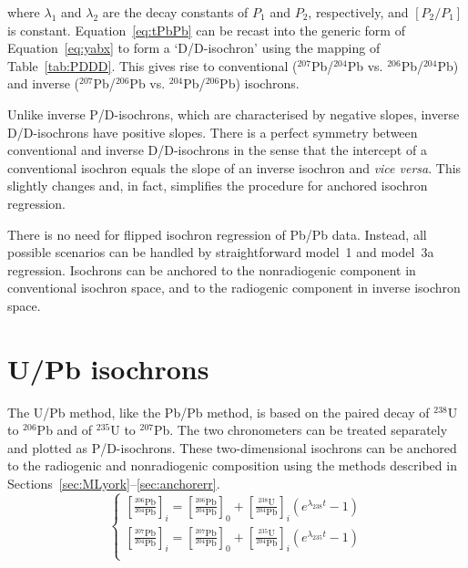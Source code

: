 \documentclass{article}
\begin{document}
\noindent where $\lambda_1$ and $\lambda_2$ are the decay constants of
$P_1$ and $P_2$, respectively, and $[P_2/P_1]$ is
constant. Equation~\ref{eq:tPbPb} can be recast into the generic form
of Equation~\ref{eq:yabx} to form a `D/D-isochron' using the mapping
of Table~\ref{tab:PDDD}. This gives rise to conventional
(${}^{207}$Pb/${}^{204}$Pb vs. ${}^{206}$Pb/${}^{204}$Pb) and inverse
(${}^{207}$Pb/${}^{206}$Pb vs. ${}^{204}$Pb/${}^{206}$Pb) isochrons.\medskip

Unlike inverse P/D-isochrons, which are characterised by negative
slopes, inverse D/D-isochrons have positive slopes. There is a perfect
symmetry between conventional and inverse D/D-isochrons in the sense
that the intercept of a conventional isochron equals the slope of an
inverse isochron and \emph{vice versa}.  This slightly changes and, in
fact, simplifies the procedure for anchored isochron
regression.\medskip

There is no need for flipped isochron regression of Pb/Pb
data. Instead, all possible scenarios can be handled by
straightforward model~1 and model~3a regression. Isochrons can be
anchored to the nonradiogenic component in conventional isochron
space, and to the radiogenic component in inverse isochron space.

\section{U/Pb isochrons}\label{sec:UPb}

The U/Pb method, like the Pb/Pb method, is based on the paired decay
of ${}^{238}$U to ${}^{206}$Pb and of ${}^{235}$U to ${}^{207}$Pb. The
two chronometers can be treated separately and plotted as
P/D-isochrons.  These two-dimensional isochrons can be anchored to the
radiogenic and nonradiogenic composition using the methods described
in Sections~\ref{sec:MLyork}--\ref{sec:anchorerr}.
\begin{equation}
  \begin{cases}
    \left[\frac{{}^{206}\mbox{Pb}}{{}^{204}\mbox{Pb}}\right]_i =
    \left[\frac{{}^{206}\mbox{Pb}}{{}^{204}\mbox{Pb}}\right]_0 +
    \left[\frac{{}^{238}\mbox{U}}{{}^{204}\mbox{Pb}}\right]_i
    \left(e^{\lambda_{238}t}-1\right)\\
    \left[\frac{{}^{207}\mbox{Pb}}{{}^{204}\mbox{Pb}}\right]_i =
    \left[\frac{{}^{207}\mbox{Pb}}{{}^{204}\mbox{Pb}}\right]_0 +
    \left[\frac{{}^{235}\mbox{U}}{{}^{204}\mbox{Pb}}\right]_i
    \left(e^{\lambda_{235}t}-1\right)\\
  \end{cases}
\end{equation}
\end{document}
